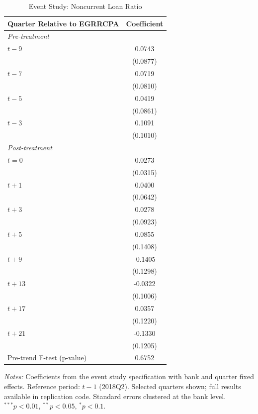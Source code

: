 \begin{table}[t]
\centering
\caption{Event Study: Noncurrent Loan Ratio}
\label{tab:eventstudy}
\small
\begin{threeparttable}
\begin{tabular}{lc}
\toprule
Quarter Relative to EGRRCPA & Coefficient \\
\midrule
\textit{Pre-treatment} & \\
$t-9$ & 0.0743 \\
& (0.0877) \\
$t-7$ & 0.0719 \\
& (0.0810) \\
$t-5$ & 0.0419 \\
& (0.0861) \\
$t-3$ & 0.1091 \\
& (0.1010) \\
\addlinespace
\textit{Post-treatment} & \\
$t=0$ & 0.0273 \\
& (0.0315) \\
$t+1$ & 0.0400 \\
& (0.0642) \\
$t+3$ & 0.0278 \\
& (0.0923) \\
$t+5$ & 0.0855 \\
& (0.1408) \\
$t+9$ & -0.1405 \\
& (0.1298) \\
$t+13$ & -0.0322 \\
& (0.1006) \\
$t+17$ & 0.0357 \\
& (0.1220) \\
$t+21$ & -0.1330 \\
& (0.1205) \\
\midrule
Pre-trend F-test (p-value) & 0.6752 \\
\bottomrule
\end{tabular}
\begin{tablenotes}
\item \textit{Notes:} Coefficients from the event study specification with bank and quarter fixed effects. Reference period: $t-1$ (2018Q2). Selected quarters shown; full results available in replication code. Standard errors clustered at the bank level. $^{***}p<0.01$, $^{**}p<0.05$, $^{*}p<0.1$.
\end{tablenotes}
\end{threeparttable}
\end{table}
